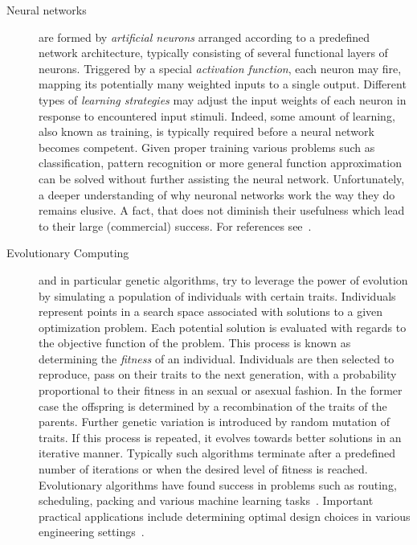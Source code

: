		\begin{description}
			
			\item[Neural networks] are formed by \emph{artificial neurons} arranged according to a predefined network architecture, typically consisting of several functional layers of neurons. Triggered by a special \emph{activation function}, each neuron may fire, \ie mapping its potentially many weighted inputs to a single output. Different types of \emph{learning strategies} may adjust the input weights of each neuron in response to encountered input stimuli. Indeed, some amount of learning, also known as training, is typically required before a neural network becomes competent. Given proper training various problems such as classification, pattern recognition or more general function approximation can be solved without further assisting the neural network. Unfortunately, a deeper understanding of why neuronal networks work the way they do remains elusive. A fact, that does not diminish their usefulness which lead to their large (commercial) success. For references see~\cite{Haykin:1998:NNC:521706,Fausett:1994:FNN:197023,Bishop:1995:NNP:525960}.

			\item[Evolutionary Computing] and in particular genetic algorithms, try to leverage the power of evolution by simulating a population of individuals with certain traits. Individuals represent points in a search space associated with solutions to a given optimization problem. Each potential solution is evaluated with regards to the objective function of the problem. This process is known as determining the \emph{fitness} of an individual. Individuals are then selected to reproduce, \ie pass on their traits to the next generation, with a probability proportional to their fitness in an sexual or asexual fashion. In the former case the offspring is determined by a recombination of the traits of the parents. Further genetic variation is introduced by random mutation of traits. If this process is repeated, it evolves towards better solutions in an iterative manner. Typically such algorithms terminate after a predefined number of iterations or when the desired level of fitness is reached. Evolutionary algorithms have found success in problems such as routing, scheduling, packing and various machine learning tasks~\cite{Back:1997:HEC:548530,spears1993overview,zitzler2000comparison}. Important practical applications include determining optimal design choices in various engineering settings~\cite{Schwefel:1993:EOS:529401,kicinger2005evolutionary}.


\end{description}
